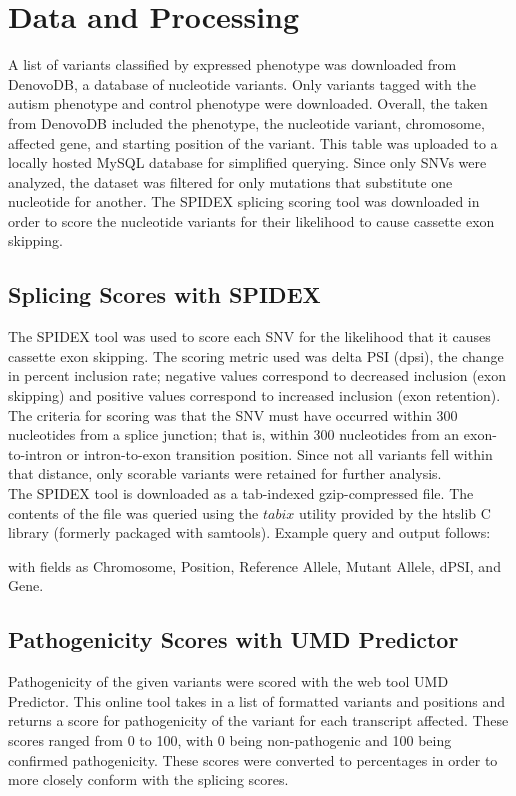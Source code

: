 \documentclass[12pt]{article}
\begin{document}
\section{Data and Processing}
A list of variants classified by expressed phenotype was downloaded from 
DenovoDB, a database of nucleotide variants. Only variants tagged with the
autism phenotype and control phenotype were downloaded. Overall, the 
taken from DenovoDB included the phenotype, the nucleotide variant, chromosome,
affected gene, and starting position of the variant. This table was uploaded
to a locally hosted MySQL database for simplified querying. Since only SNVs 
were analyzed, the dataset was filtered for only mutations that substitute
one nucleotide for another. The SPIDEX splicing scoring tool was downloaded 
in order to score the nucleotide variants for their likelihood to cause 
cassette exon skipping.

\subsection{Splicing Scores with SPIDEX}
The SPIDEX tool was used to score each SNV for the likelihood that
it causes cassette exon skipping. The scoring metric used was delta PSI (dpsi),
the change in percent inclusion rate; negative values correspond to decreased
inclusion (exon skipping) and positive values correspond to increased inclusion 
(exon retention). The criteria for scoring was that the SNV must have occurred
within 300 nucleotides from a splice junction; that is, within 300 
nucleotides from an exon-to-intron or intron-to-exon transition position. Since
not all variants fell within that distance, only scorable variants were 
retained for further analysis.
\\[\baselineskip]
The SPIDEX tool is downloaded as a tab-indexed gzip-compressed file. The contents of the
file was queried using the $tabix$ utility provided by the htslib C library 
(formerly packaged with samtools). Example query and output follows:



with fields as Chromosome, Position, Reference Allele, Mutant Allele, dPSI, 
and Gene. 

\subsection{Pathogenicity Scores with UMD Predictor}
Pathogenicity of the given variants were scored with the web tool UMD 
Predictor. This online tool takes in a list of formatted variants and positions
and returns a score for pathogenicity of the variant for each transcript 
affected. These scores ranged from 0 to 100, with 0 being non-pathogenic and
100 being confirmed pathogenicity. These scores were converted to percentages
in order to more closely conform with the splicing scores.
\end{document}

